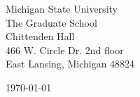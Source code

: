 \begin{minipage}{0.49\textwidth}
\begin{flushleft}
\noindent
Michigan State University \\
The Graduate School\\
Chittenden Hall\\
466 W. Circle Dr. 2nd floor\\
East Lansing, Michigan 48824
\end{flushleft}
\end{minipage}
\begin{minipage}{0.47\textwidth}
\begin{flushright}
\today
\end{flushright}
\end{minipage} \\

\newcommand{\univ}{Michigan State University}
\newcommand{\univshort}{MSU}
\newcommand{\degree}{Ph.D.}
\newcommand{\dept}{Computer Science}



